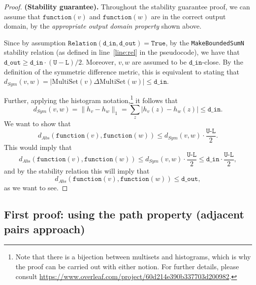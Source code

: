 \documentclass[11pt,a4paper]{article}
\theoremstyle{definition}
\newcommand{\MultiSet}{\mathrm{MultiSet}}
\newcommand{\din}{\texttt{d\_in}}
\newcommand{\dout}{\texttt{d\_out}}
\newcommand{\Relation}{\texttt{Relation}}
\newcommand{\U}{\texttt{U}}
\newcommand{\True}{\texttt{True}}
\newcommand{\function}{\texttt{function}}
\begin{document}
\begin{proof}
    \smallskip
    \textbf{(Stability guarantee).} Throughout the stability guarantee proof, we can assume that $\function(v)$ and $\function(w)$ are in the correct output domain, by the \textit{appropriate output domain property} shown above. 
    
    Since by assumption $\Relation(\din, \dout) = \True$, by the \texttt{MakeBoundedSumN} stability relation (as defined in line~\ref{line:rel} in the pseudocode), we have that $\dout \geq \din \cdot (\U - \texttt{L})/2$. Moreover, $v, w$ are assumed to be $\din$-close. By the definition of the symmetric difference metric, this is equivalent to stating that $d_{Sym}(v, w) = |\MultiSet(v) \Delta \MultiSet(w)| \leq \din$.

    Further, applying the histogram notation,\footnote{Note that there is a bijection between multisets and histograms, which is why the proof can be carried out with either notion. For further details, please consult \url{https://www.overleaf.com/project/60d214e390b337703d200982}.}  it follows that
    \[
        d_{Sym}(v, w) = \lVert h_{v} - h_{w}\rVert_1 = \sum_z |h_v(z) - h_w(z)| \leq \din.
    \]
    We want to show that
    \[
        d_{Abs}(\function(v), \function(w)) \leq d_{Sym}(v, w) \cdot \dfrac{\texttt{U-L}}{2}.
    \]
    This would imply that
    \begin{equation}\label{eq:abs1}
        d_{Abs}(\function(v), \function(w)) \leq d_{Sym}(v, w) \cdot \dfrac{\texttt{U-L}}{2} \leq \din \cdot \dfrac{\texttt{U-L}}{2},
    \end{equation}
    and by the stability relation this will imply that
    \begin{equation}\label{eq:abs2}
        d_{Abs}(\function(v), \function(w)) \leq \dout,
    \end{equation}
    as we want to see. 
\end{proof}

\subsection{First proof: using the path property (adjacent pairs approach)}
\end{document}
